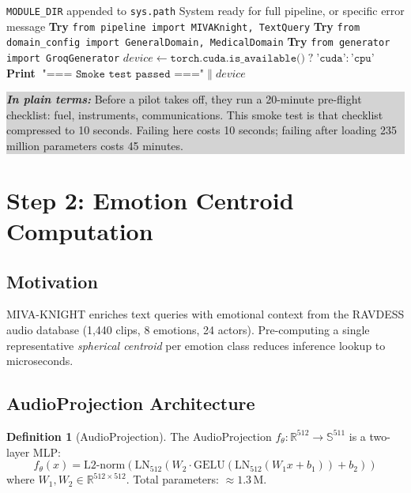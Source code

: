 \documentclass[12pt, a4paper]{article}
\theoremstyle{definition}
\newtheorem{definition}{Definition}[section]
\theoremstyle{plain}
\theoremstyle{remark}
\newcommand{\R}{\mathbb{R}}
\newcommand{\Sphere}{\mathbb{S}}
\newcommand{\layman}[1]{%
  \vspace{4pt}%
  \noindent\colorbox{lightgray}{\parbox{\dimexpr\linewidth-2\fboxsep}{%
    \textbf{\textit{In plain terms:}} #1}}%
  \vspace{4pt}%
}
\begin{document}
\begin{algorithm}[H]
\caption{SMOKE\_TEST --- Pre-flight Infrastructure Verification}
\label{alg:smoketest}
\begin{algorithmic}[1]
\Require \texttt{MODULE\_DIR} appended to \texttt{sys.path}
\Ensure System ready for full pipeline, or specific error message
\State \textbf{Try} \texttt{from pipeline import MIVAKnight, TextQuery}
\State \textbf{Try} \texttt{from domain\_config import GeneralDomain, MedicalDomain}
\State \textbf{Try} \texttt{from generator import GroqGenerator}
\State $\textit{device} \gets \texttt{torch.cuda.is\_available()} \;?\; \texttt{'cuda'} : \texttt{'cpu'}$
\State \textbf{Print} $\texttt{"=== Smoke test passed ==="} \;\|\; \textit{device}$
\end{algorithmic}
\end{algorithm}

\layman{Before a pilot takes off, they run a 20-minute pre-flight checklist: fuel, instruments, communications. This smoke test is that checklist compressed to 10 seconds. Failing here costs 10 seconds; failing after loading 235 million parameters costs 45 minutes.}

\section{Step 2: Emotion Centroid Computation}
\label{sec:centroids}

\subsection{Motivation}

MIVA-KNIGHT enriches text queries with emotional context from the RAVDESS audio database (1,440 clips, 8 emotions, 24 actors). Pre-computing a single representative \emph{spherical centroid} per emotion class reduces inference lookup to microseconds.

\subsection{AudioProjection Architecture}

\begin{definition}[AudioProjection]
The AudioProjection $f_\theta: \R^{512} \to \Sphere^{511}$ is a two-layer MLP:
\[
f_\theta(x) = \text{L2-norm}\!\left(\text{LN}_{512}\!\left(W_2 \cdot \text{GELU}\!\left(\text{LN}_{512}(W_1 x + b_1)\right) + b_2\right)\right)
\]
where $W_1, W_2 \in \R^{512 \times 512}$. Total parameters: $\approx 1.3\,\text{M}$.
\end{definition}
\end{document}

